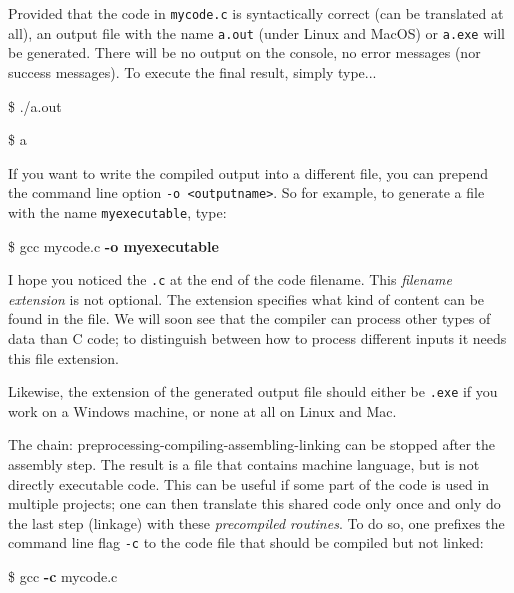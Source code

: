 Provided that the code in \texttt{mycode.c} is syntactically correct (\ie can be translated at all), an output file with the name \texttt{a.out} (under Linux and MacOS) or \texttt{a.exe} will be generated. There will be no output on the console, \ie no error messages (nor success messages). To execute the final result, simply type...
\begin{tcbraster}[raster columns=2,
                  raster equal height,
                  nobeforeafter,
                  raster column skip=0.2cm]
\begin{cmdbox}
\$ ./a.out
\end{cmdbox}
%
\begin{cmdbox}
\$ a
\end{cmdbox}
\end{tcbraster}

If you want to write the compiled output into a different file, you can prepend the command line option \texttt{-o <outputname>}. So for example, to generate a file with the name \texttt{myexecutable}, type:
\begin{cmdbox}
\$ gcc mycode.c \textbf{-o myexecutable}
\end{cmdbox}

\begin{warnbox}
I hope you noticed the \texttt{.c} at the end of the code filename. This \emph{filename extension} is not optional. The extension specifies what kind of content can be found in the file. We will soon see that the compiler can process other types of data than C code; to distinguish between how to process different inputs it needs this file extension.

Likewise, the extension of the generated output file should either be \texttt{.exe} if you work on a Windows machine, or none at all on Linux and Mac.
\end{warnbox}

The chain: preprocessing-compiling-assembling-linking can be stopped after the assembly step. The result is a file that contains machine language, but is not directly executable code. This can be useful if some part of the code is used in multiple projects; one can then translate this shared code only once and only do the last step (linkage) with these \emph{precompiled routines}. To do so, one prefixes the command line flag \texttt{-c} to the code file that should be compiled but not linked:
\begin{cmdbox}
\$ gcc \textbf{-c} mycode.c
\end{cmdbox}

